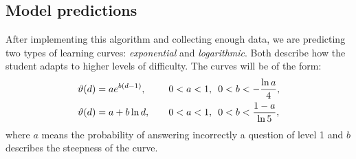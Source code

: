 \documentclass{article}
\newcommand{\0}{\mathbbold{0}}
\newcommand{\1}{\mathds{1}}
\begin{document}
\subsection{Model predictions}
After implementing this algorithm and collecting enough data, we are predicting two types of learning curves: \textsl{exponential} and \textsl{logarithmic}.
Both describe how the student adapts to higher levels of difficulty. The curves will be of the form:
\begin{alignat}{4}
    \vartheta(d) &= ae^{b(d-1)},\mkern20mu &0<a<1,~~&0<b<-\frac{\ln a}{4},\label{eqexp} \\
    \vartheta(d) &= a + b\ln d,\mkern20mu &0<a<1,~~&0<b<\frac{1-a}{\ln 5},\label{eqlog}
\end{alignat}
where $a$ means the probability of answering incorrectly a question of level 1 and $b$ describes the steepness of the curve.
\end{document}
